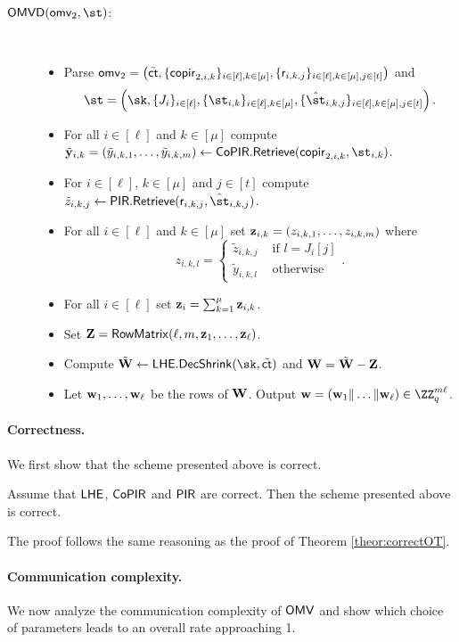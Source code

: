 \begin{description}
\item[$\OMVD(\omv_2,\st)$:]~
\begin{itemize}
    \item Parse $\mathsf{omv}_2=\left(\tilde{\mathsf{ct}},\{\mathsf{copir}_{2,i,k}\}_{i\in[\ell],k\in[\mu]}, \{\mathsf{r}_{i,k,j}\}_{i \in [\ell],k\in[\mu] ,j \in [t]} \right)$ and  $$\st = \left(\sk,\{J_i\}_{i \in [\ell]},\{\st_{i,k}\}_{i \in [\ell],k\in[\mu]},\{\hat{\st}_{i,k,j}\}_{i \in [\ell],k\in[\mu], j \in [t]}\right).$$
    \item For all $i\in[\ell]$ and $k\in[\mu]$ compute $\tilde \yn_{i,k}=(\tilde y_{i,k,1},\dots, \tilde y_{i,k,m})\leftarrow\CoPIR.\retrieve(\copir_{2,i,k},\st_{i,k})$.
    \item For $i \in [\ell]$, $k\in[\mu]$ and $j \in [t]$ compute $\tilde{z}_{i,k,j} \gets \PIR.\retrieve(\resp_{i,k,j},\hat{\st}_{i,k,j})$.
    \item For all $i\in[\ell]$ and $k\in[\mu]$ set $\mathbf{z}_{i,k}=(z_{i,k,1},\dots, z_{i,k,m})$ where  
    \[
    z_{i,k,l} = \begin{cases}\tilde{z}_{i,k,j} & \text{ if } l = J_i[j] \\ \tilde y_{i,k,l} & \text{ otherwise} \end{cases}.
    \]
    \item For all $i\in[\ell]$ set $\mathbf{z}_i=\sum_{k=1}^\mu \mathbf{z}_{i,k}$.
    \item Set $\mathbf{Z} = \mathsf{RowMatrix}(\ell,m,\mathbf{z}_1,\dots,\mathbf{z}_\ell)$.
    \item Compute $\tilde{\vc{W}} \gets \LHE.\decshrink(\sk,\tilde{\ct})$ and $\mathbf{W} = \tilde{\mathbf{W}} - \mathbf{Z}$.
    \item Let $\mathbf{w}_1,\dots,\mathbf{w}_\ell$ be the rows of $\mathbf{W}$. Output $\vc{w} = (\vc{w}_1 \| \dots \| \vc{w}_\ell) \in \ZZ_q^{m \ell}$.
\end{itemize}
\end{description}


\paragraph{Correctness.} We first show that the scheme presented above is correct.

\begin{theorem}[Correctness]
Assume that $\mathsf{LHE}$, $\mathsf{CoPIR}$ and $\mathsf{PIR}$ are correct. Then the scheme presented above is correct.
\end{theorem}
The proof follows the same reasoning as the proof of Theorem \ref{theor:correctOT}.

\paragraph{Communication complexity.}
We now analyze the communication complexity of $\mathsf{OMV}$ and show which choice of parameters leads to an overall rate approaching 1.

